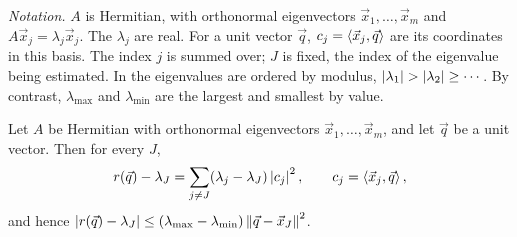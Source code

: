 \emph{Notation.} $A$ is Hermitian, with orthonormal eigenvectors $\vec{x}_1, \dots, \vec{x}_m$ and $A\vec{x}_j = \lambda_j\vec{x}_j$. The $\lambda_j$ are real. For a unit vector $\vec{q}$, $c_j = \left\langle \vec{x}_j, \vec{q} \right\rangle$ are its coordinates in this basis. The index $j$ is summed over; $J$ is fixed, the index of the eigenvalue being estimated. In  the eigenvalues are ordered by modulus, $\left\lvert \lambda_1 \right\rvert > \left\lvert \lambda_2 \right\rvert \ge \cdots$. By contrast, $\lambda_{\max}$ and $\lambda_{\min}$ are the largest and smallest by value.

\begin{lemma}
  \label{lem:rayleigh-quad}
  Let $A$ be Hermitian with orthonormal eigenvectors $\vec{x}_1, \dots, \vec{x}_m$, and let $\vec{q}$ be a unit vector. Then for every $J$,
  \begin{equation}
    r(\vec{q}) - \lambda_J = \sum_{j \ne J}(\lambda_j - \lambda_J)\left\lvert c_j \right\rvert^2, \qquad c_j = \left\langle \vec{x}_j, \vec{q} \right\rangle,
  \end{equation}
  and hence $\left\lvert r(\vec{q}) - \lambda_J \right\rvert \le (\lambda_{\max} - \lambda_{\min})\left\lVert \vec{q} - \vec{x}_J \right\rVert^2$.
\end{lemma}

